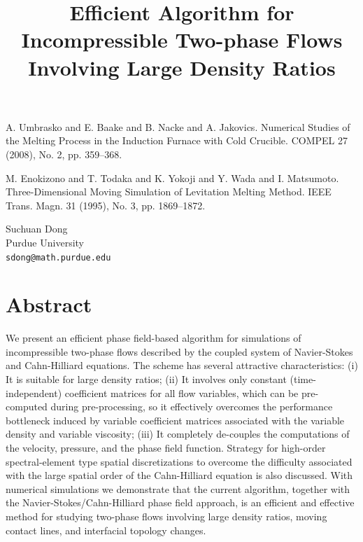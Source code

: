 \documentclass[article,A4,11pt]{llncs}%
\begin{document}

\begin{thebibliography}{10}
{\sc A. Umbrasko and E. Baake and B. Nacke and A. Jakovics}. {Numerical Studies of the Melting Process in the Induction Furnace with Cold Crucible}. COMPEL 	27 (2008), No. 2, pp. 359--368.

{\sc M. Enokizono and T. Todaka and K. Yokoji and Y. Wada and I. Matsumoto}. {Three-Dimensional Moving Simulation of Levitation Melting Method}. IEEE Trans. Magn. 31 (1995), No. 3, pp. 1869--1872.
\end{thebibliography}

\title{Efficient Algorithm for Incompressible Two-phase Flows Involving Large Density Ratios}
 \author{} \institute{}
\maketitle
\begin{center}
{\large Suchuan Dong}\\
Purdue University\\
{\tt sdong@math.purdue.edu}
\end{center}

\section*{Abstract}
We present an efficient phase field-based  algorithm for simulations of incompressible two-phase flows described by the coupled system of  Navier-Stokes and Cahn-Hilliard equations. 
The scheme has several attractive characteristics: 
(i) It is suitable for large density ratios; 
(ii) It involves only constant (time-independent) 
coefficient matrices for all flow variables, 
which can be pre-computed during pre-processing, 
so it effectively overcomes the performance 
bottleneck induced by variable coefficient matrices associated with the variable density and
variable viscosity; 
(iii) It  completely de-couples 
the computations of the velocity, pressure, 
and the phase field function. 
Strategy for high-order spectral-element type spatial discretizations to overcome the difficulty associated with the large spatial 
order of the Cahn-Hilliard equation 
is also discussed. 
With numerical simulations we demonstrate that 
the current algorithm, together 
with the Navier-Stokes/Cahn-Hilliard phase field 
approach, is an efficient and effective method 
for studying two-phase flows 
involving large density ratios, moving contact 
lines, and interfacial topology changes. 
\end{document}
